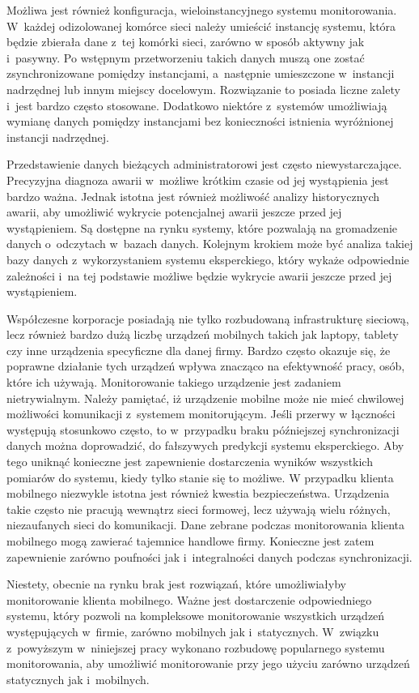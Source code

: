 Możliwa jest również konfiguracja, wieloinstancyjnego systemu
monitorowania. W~każdej odizolowanej komórce sieci należy umieścić
instancję systemu, która będzie zbierała dane z~tej komórki sieci,
zarówno w sposób aktywny jak i~pasywny. Po wstępnym przetworzeniu
takich danych muszą one zostać zsynchronizowane pomiędzy instancjami,
a~następnie umieszczone w~instancji nadrzędnej lub innym miejscy
docelowym. Rozwiązanie to posiada liczne zalety i~jest bardzo często
stosowane. Dodatkowo niektóre z~systemów umożliwiają wymianę danych
pomiędzy instancjami bez konieczności istnienia wyróżnionej instancji
nadrzędnej.

Przedstawienie danych bieżących administratorowi jest często
niewystarczające. Precyzyjna diagnoza awarii w~możliwe krótkim czasie
od jej wystąpienia jest bardzo ważna. Jednak istotna jest również
możliwość analizy historycznych awarii, aby umożliwić wykrycie
potencjalnej awarii jeszcze przed jej wystąpieniem. Są dostępne na
rynku systemy, które pozwalają na gromadzenie danych o~odczytach
w~bazach danych. Kolejnym krokiem może być analiza takiej bazy danych
z~wykorzystaniem systemu eksperckiego, który wykaże odpowiednie
zależności i~na tej podstawie możliwe będzie wykrycie awarii jeszcze
przed jej wystąpieniem.

Współczesne korporacje posiadają nie tylko rozbudowaną infrastrukturę
sieciową, lecz również bardzo dużą liczbę urządzeń mobilnych takich
jak laptopy, tablety czy inne urządzenia specyficzne dla danej
firmy. Bardzo często okazuje się, że poprawne działanie tych urządzeń
wpływa znacząco na efektywność pracy, osób, które ich
używają. Monitorowanie takiego urządzenie jest zadaniem
nietrywialnym. Należy pamiętać, iż urządzenie mobilne może nie mieć
chwilowej możliwości komunikacji z~systemem monitorującym. Jeśli
przerwy w łączności występują stosunkowo często, to w~przypadku braku
późniejszej synchronizacji danych można doprowadzić, do fałszywych
predykcji systemu eksperckiego. Aby tego uniknąć konieczne jest
zapewnienie dostarczenia wyników wszystkich pomiarów do systemu, kiedy
tylko stanie się to możliwe. W przypadku klienta mobilnego niezwykle
istotna jest również kwestia bezpieczeństwa. Urządzenia takie często
nie pracują wewnątrz sieci formowej, lecz używają wielu różnych,
niezaufanych sieci do komunikacji. Dane zebrane podczas monitorowania
klienta mobilnego mogą zawierać tajemnice handlowe firmy. Konieczne
jest zatem zapewnienie zarówno poufności jak i~integralności danych
podczas synchronizacji.

Niestety, obecnie na rynku brak jest rozwiązań, które umożliwiałyby
monitorowanie klienta mobilnego. Ważne jest dostarczenie odpowiedniego
systemu, który pozwoli na kompleksowe monitorowanie wszystkich
urządzeń występujących w~firmie, zarówno mobilnych jak
i~statycznych. W~związku z~powyższym w~niniejszej pracy wykonano
rozbudowę popularnego systemu monitorowania, aby umożliwić
monitorowanie przy jego użyciu zarówno urządzeń statycznych jak
i~mobilnych.

